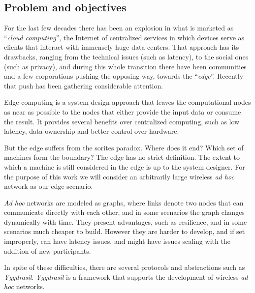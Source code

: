 \documentclass[runningheads]{llncs}
\begin{document}
\subsection*{Problem and objectives}
For the last few decades there has been an explosion in what is marketed as ``\textit{cloud computing}''\cite{Gartner:2017}, the Internet of centralized services in which devices serve as clients that interact with immensely huge data centers.
That approach has its drawbacks, ranging from the technical issues (such as latency), to the social ones (such as privacy), and during this whole transition there have been communities and a few corporations pushing the opposing way, towards the ``\textit{edge}''\cite{Satyanarayanan:2017}. Recently that push has been gathering considerable attention.
\par Edge computing is a system design approach that leaves the computational nodes as near as possible to the nodes that either provide the input data or consume the result.
It provides several benefits over centralized computing, such as low latency, data ownership and better control over hardware.
\par But the edge suffers from the sorites paradox\cite{Leitao:2018}. Where does it end? Which set of machines form the boundary?
The edge has no strict definition. The extent to which a machine is still considered in the edge is up to the system designer. For the purpose of this work we will consider an arbitrarily large wireless \textit{ad hoc} network as our edge scenario.
\par \textit{Ad hoc} networks are modeled as graphs, where links denote two nodes that can communicate directly with each other, and in some scenarios the graph changes dynamically with time\cite{Akos:2018}. They present advantages, such as resilience, and in some scenarios  much cheaper to build. However they are harder to develop, and if set improperly, can have latency issues, and might have issues scaling with the addition of new participants. 
\par In spite of these difficulties, there are several protocols and abstractions such as \textit{Yggdrasil}\cite{Akos:2018}. \textit{Yggdrasil} is a framework that supports the development of wireless \textit{ad hoc} networks.
\end{document}
